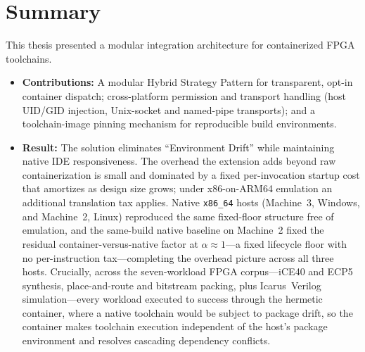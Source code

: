 \section{Summary}
This thesis presented a modular integration architecture for containerized FPGA toolchains.
\begin{itemize}
    \item \textbf{Contributions:} A modular Hybrid Strategy Pattern for transparent, opt-in container dispatch; cross-platform permission and transport handling (host UID/GID injection, Unix-socket and named-pipe transports); and a toolchain-image pinning mechanism for reproducible build environments.
    \item \textbf{Result:} The solution eliminates ``Environment Drift'' while maintaining native IDE responsiveness. The overhead the extension adds beyond raw containerization is small and dominated by a fixed per-invocation startup cost that amortizes as design size grows; under x86-on-ARM64 emulation an additional translation tax applies. Native \texttt{x86\_64} hosts (Machine~3, Windows, and Machine~2, Linux) reproduced the same fixed-floor structure free of emulation, and the same-build native baseline on Machine~2 fixed the residual container-versus-native factor at $\alpha \approx 1$---a fixed lifecycle floor with no per-instruction tax---completing the overhead picture across all three hosts. Crucially, across the seven-workload FPGA corpus---iCE40 and ECP5 synthesis, place-and-route and bitstream packing, plus Icarus~Verilog simulation---every workload executed to success through the hermetic container, where a native toolchain would be subject to package drift, so the container makes toolchain execution independent of the host's package environment and resolves cascading dependency conflicts.
\end{itemize}

